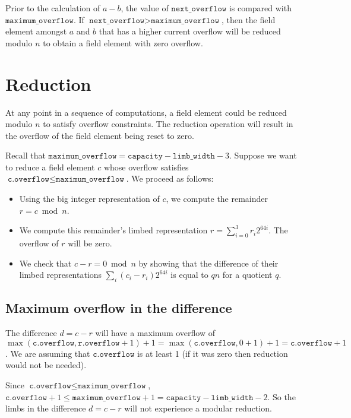 \documentclass[a4paper, 12pt]{article}
\begin{document}
 Prior to the calculation of $a-b$, the value of $\texttt{next\_overflow}$ is compared with $\texttt{maximum\_overflow}$. If $\texttt{next\_overflow} > \texttt{maximum\_overflow}$, then the field element amongst $a$ and $b$ that has a higher current overflow will be reduced modulo $n$ to obtain a field element with zero overflow.

\section{Reduction}%
\label{sec:reduction}

 At any point in a sequence of computations, a field element could be reduced modulo $n$ to satisfy overflow constraints. The reduction operation will result in the overflow of the field element being reset to zero. 

 Recall that $\texttt{maximum\_overflow} = \texttt{capacity} - \texttt{limb\_width} - 3$. Suppose we want to reduce a field element $c$ whose overflow satisfies $\texttt{c.overflow} \le \texttt{maximum\_overflow}$. We proceed as follows:

\begin{itemize}
  \item Using the big integer representation of $c$, we compute the remainder $r = c \bmod n$. 
  \item We compute this remainder's limbed representation $r = \sum_{i=0}^3 r_i 2^{64i}$. The overflow of $r$ will be zero.
  \item We check that $c-r = 0 \bmod n$ by showing that the difference of their limbed representations $\sum_{i} (c_i - r_i)2^{64i}$ is equal to $qn$ for a quotient $q$.
\end{itemize}

\subsection{Maximum overflow in the difference}
\label{sub:maximum_overflow_in_the_difference}

The difference $d = c-r$ will have a maximum overflow of $\max(\texttt{c.overflow}, \texttt{r.overflow} + 1)+1 = \max(\texttt{c.overflow}, 0 + 1) + 1 = \texttt{c.overflow} + 1$. We are assuming that $\texttt{c.overflow}$ is at least 1 (if it was zero then reduction would not be needed).
    
Since $\texttt{c.overflow} \le \texttt{maximum\_overflow}$, $\texttt{c.overflow} + 1 \le \texttt{maximum\_overflow} + 1 = \texttt{capacity} - \texttt{limb\_width} - 2$. So the limbs in the difference $d = c-r$ will not experience a modular reduction.
\end{document}
